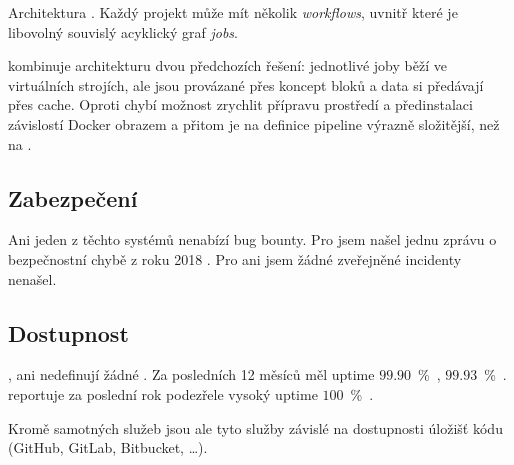          \begin{iffigure}
            \centering
            \caption{Architektura \circleci. Každý projekt může mít několik \textit{workflows}, uvnitř které je libovolný souvislý acyklický graf \textit{jobs}.}
            \label{pic:circle-architecture}
        \end{iffigure}

        \semaphore kombinuje architekturu dvou předchozích řešení: jednotlivé joby běží ve virtuálních strojích, ale jsou provázané přes koncept bloků a data si předávají přes cache. Oproti \circleci chybí možnost zrychlit přípravu prostředí a předinstalaci závislostí Docker obrazem a přitom je na \semaphore definice pipeline výrazně složitější, než na \travis.

    \subsection{Zabezpečení}
        Ani jeden z těchto  \CI systémů nenabízí bug bounty. Pro \travis jsem našel jednu zprávu o bezpečnostní chybě z roku 2018 \cite{travis-db-drop}. Pro \circleci ani \semaphore jsem žádné zveřejněné incidenty nenašel.

    \subsection{Dostupnost}
        \circleci, \travis ani \semaphore nedefinují žádné . Za posledních 12 měsíců měl \circleci uptime $99.90$~\%~\cite{circle-uptime}, \travis $99.93$~\%~\cite{travis-uptime}. \semaphore reportuje za poslední rok podezřele vysoký uptime $100$~\%~\cite{semaphore-uptime}.

        Kromě samotných \CI služeb jsou ale tyto služby závislé na dostupnosti úložišť kódu (GitHub, GitLab, Bitbucket, …).

